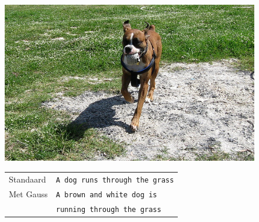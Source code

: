 \begin{figure}
	\centering
	\begin{minipage}[t]{.3\textwidth}
		\centering
		\vspace{0pt}
		\includegraphics[width=\textwidth]{Images/Results/gauss/hond}
	\end{minipage}\hfill
	\begin{minipage}[t]{.7\textwidth}
		\vspace{0pt}
		\begin{tabular}{ll}
			Standaard & \texttt{A dog runs through the grass} \\
			Met Gauss & \texttt{A brown and white dog is}\\
			~ & \texttt{running through the grass} \\
		\end{tabular}
	\end{minipage}
	

\end{figure}
